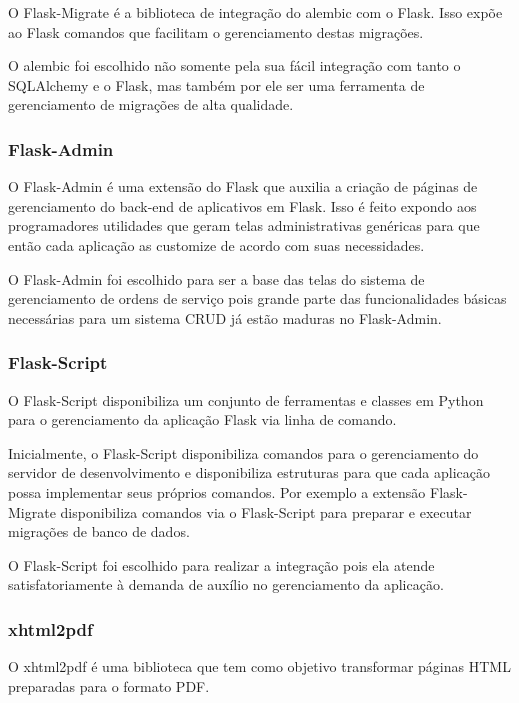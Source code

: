 \documentclass[
	article,			%
	11pt,				%
	oneside,			%
	a4paper,			%
	english,			%
	brazil,				%
	sumario=tradicional
	]{abntex2}
\begin{document}
O Flask-Migrate é a biblioteca de integração do alembic com o Flask. Isso expõe
ao Flask comandos que facilitam o gerenciamento destas migrações. \cite{flaskmigrate}

O alembic foi escolhido não somente pela sua fácil integração com tanto o
SQLAlchemy e o Flask, mas também por ele ser uma ferramenta de gerenciamento de
migrações de alta qualidade.


\subsubsection{Flask-Admin}

O Flask-Admin é uma extensão do Flask que auxilia a criação de páginas de
gerenciamento do back-end de aplicativos em Flask. Isso é feito expondo aos
programadores utilidades que geram telas administrativas genéricas para que
então cada aplicação as customize de acordo com suas necessidades. \cite{flaskadmin}

O Flask-Admin foi escolhido para ser a base das telas do sistema de
gerenciamento de ordens de serviço pois grande parte das funcionalidades básicas
necessárias para um sistema CRUD já estão maduras no Flask-Admin.

\subsubsection{Flask-Script}

O Flask-Script disponibiliza um conjunto de ferramentas e classes em Python
para o gerenciamento da aplicação Flask via linha de comando.

Inicialmente, o Flask-Script disponibiliza comandos para o gerenciamento do
servidor de desenvolvimento e disponibiliza estruturas para que cada aplicação
possa implementar seus próprios comandos. \cite{flaskscript} Por exemplo a extensão Flask-Migrate
disponibiliza comandos via o Flask-Script para preparar e executar migrações de
banco de dados.

O Flask-Script foi escolhido para realizar a integração pois ela atende
satisfatoriamente à demanda de auxílio no gerenciamento da aplicação.

\subsubsection{xhtml2pdf}

O xhtml2pdf é uma biblioteca que tem como objetivo transformar páginas HTML
preparadas para o formato PDF.\cite{xhtml2pdf}
\end{document}
